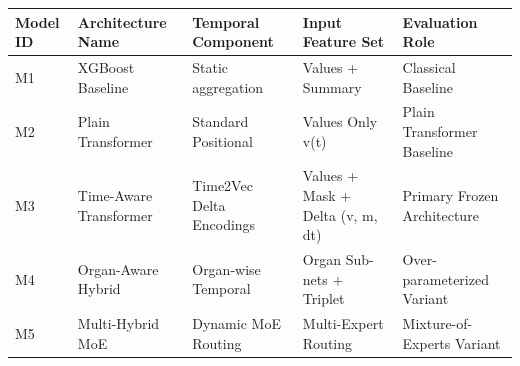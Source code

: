 \begin{tabular}{lllll}
\toprule
Model ID & Architecture Name & Temporal Component & Input Feature Set & Evaluation Role \\
\midrule
M1 & XGBoost Baseline & Static aggregation & Values + Summary & Classical Baseline \\
M2 & Plain Transformer & Standard Positional & Values Only v(t) & Plain Transformer Baseline \\
M3 & Time-Aware Transformer & Time2Vec Delta Encodings & Values + Mask + Delta (v, m, dt) & Primary Frozen Architecture \\
M4 & Organ-Aware Hybrid & Organ-wise Temporal & Organ Sub-nets + Triplet & Over-parameterized Variant \\
M5 & Multi-Hybrid MoE & Dynamic MoE Routing & Multi-Expert Routing & Mixture-of-Experts Variant \\
\bottomrule
\end{tabular}
